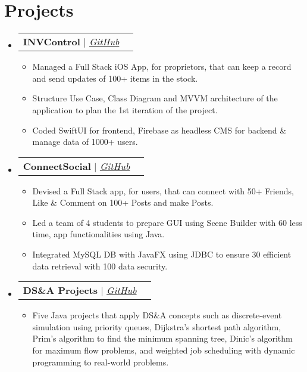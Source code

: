 \documentclass[letterpaper,11pt]{article}
\makeatletter
\newcommand{\resumeItem}[1]{
  \item\small{
    {#1 \vspace{-2pt}}
  }
}
\newcommand{\resumeProjectHeading}[2]{
    \vspace{-2pt}\item
    \begin{tabular*}{0.97\textwidth}{l@{\extracolsep{\fill}}r}
      \small#1 & #2 \\
    \end{tabular*}\vspace{-7pt}
}
\newcommand{\resumeSubHeadingListStart}{\begin{itemize}[leftmargin=0.15in, label={}]}
\newcommand{\resumeSubHeadingListEnd}{\end{itemize}}
\newcommand{\resumeItemListStart}{\begin{itemize}}
\newcommand{\resumeItemListEnd}{\end{itemize}\vspace{-5pt}}
\makeatother
\begin{document}

\section{Projects}
    \resumeSubHeadingListStart
      
      \resumeProjectHeading
        {\textbf{INVControl} $|$ \emph{\href{https://github.com/agupt295/INVControl}{\color{blue}GitHub}}}{}
          \resumeItemListStart
            \resumeItem{Managed a Full Stack iOS App, for proprietors, that can keep a record and send updates of 100+ items in the stock.}
            \resumeItem{Structure Use Case, Class Diagram and MVVM architecture of the application to plan the 1st iteration of the project.}
            \resumeItem{Coded SwiftUI for frontend, Firebase as headless CMS for backend \& manage data of 1000+ users.}
          \resumeItemListEnd
      
      \resumeProjectHeading
        {\textbf{ConnectSocial} $|$ \emph{\href{https://github.com/agupt295/ConnectSocial}{\color{blue}GitHub}}}{}
          \resumeItemListStart
            \resumeItem{Devised a Full Stack app, for users, that can connect with 50+ Friends, Like \& Comment on 100+ Posts and make Posts.}
            \resumeItem{Led a team of 4 students to prepare GUI using Scene Builder with 60 less time, app functionalities using Java.}
            \resumeItem{Integrated MySQL DB with JavaFX using JDBC to ensure 30 efficient data retrieval with 100 data security.}
          \resumeItemListEnd
      
      \resumeProjectHeading
        {\textbf{DS\&A Projects} $|$ \emph{\href{https://github.com/arasgungore/CMPE250-projects}{\color{blue}GitHub}}}{}
          \resumeItemListStart
            \resumeItem{Five Java projects that apply DS\&A concepts such as discrete-event simulation using priority queues, Dijkstra's shortest path algorithm, Prim's algorithm to find the minimum spanning tree, Dinic's algorithm for maximum flow problems, and weighted job scheduling with dynamic programming to real-world problems.}
          \resumeItemListEnd
      
    \resumeSubHeadingListEnd




        
\end{document}
